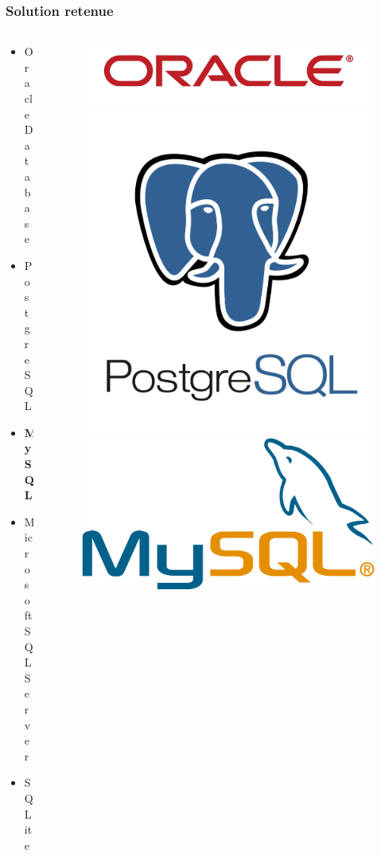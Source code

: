 \begin{frame}
\frametitle{Solution retenue}
\begin{columns}
\begin{column}{5cm}
\begin{itemize}
	\item Oracle Database
	\item PostgreSQL
	\item \textbf{MySQL}
	\item Microsoft SQL Server
	\item SQLite
\end{itemize}
\end{column}
\begin{column}{7cm}
\begin{figure}
\includegraphics[scale=0.038]{Images/Oracle}
\includegraphics[scale=0.18]{Images/PostgreSQL}\\
\includegraphics[scale=0.04]{Images/MySQL}\\

\end{figure}
\end{column}
\end{columns}
\end{frame}
